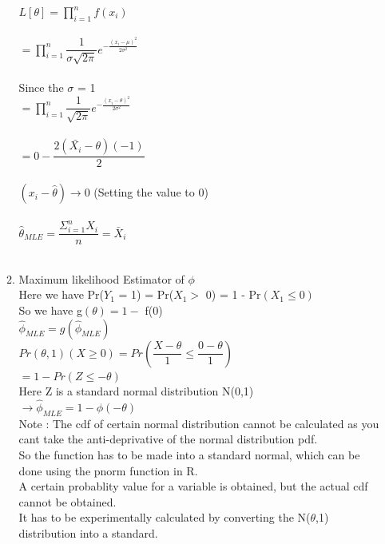 \documentclass[11pt]{article}
\begin{document}
\begin{enumerate}
\begin{enumerate}
$ L[{\theta}] = \prod_{i=1}^{n} f({x_i})     $\\\\

$ = \prod_{i=1}^{n} \dfrac{1}{\sigma \sqrt{2\pi}} e^{-\frac{({x_i}-\mu)^{2}}{2 \sigma^{2}}} $\\\\

Since the $ \sigma $ = 1 \\

$ = \prod_{i=1}^{n} \dfrac{1}{ \sqrt{2\pi}} e^{-\frac{({x_i}-\theta)^{2}}{2 \sigma^{2}}} $\\\\

$ = 0 - \dfrac{2(\bar{X_{i}}-\theta)(-1)}{2} $ \\\\

$ ({x_i}-{\hat\theta}) \rightarrow 0$ (Setting the value to 0) \\\\

$  {\hat\theta_{MLE}} = \dfrac{\Sigma_{i=1}^{n} {X_i}}{n} = \bar X_{i} $\\\\


\item Maximum likelihood Estimator of $ \phi $ \\

Here we have Pr(${Y_1}$ = 1) = Pr(${X_1} >$ 0) = 1 - Pr$({X_1} \leq 0)$\\

So we have g$(\theta) = 1 -$ f(0)\\

$ \hat\phi_{MLE} = g ({\hat\phi_{MLE}}) $ \\

$ Pr(\theta,1)(X \geq 0) = Pr(\dfrac{X - \theta}{1} \leq \dfrac{0-\theta}{1})$\\

$ = 1 - Pr(Z \leq -\theta) $\\

Here Z is a standard normal distribution N(0,1)\\

$\rightarrow \hat\phi_{MLE} = 1 - \phi(-\theta)$\\

Note : The cdf of certain normal distribution cannot be calculated as you cant take the anti-deprivative of the normal distribution pdf.\\
So the function has to be made into a standard normal, which can be done using the pnorm function in R.\\ 
A certain probablity value  for a variable is obtained, but the actual cdf cannot be obtained.\\
It has to be experimentally calculated by converting the N($\theta$,1) distribution into a standard.\\



\end{enumerate}
\end{enumerate}
\end{document}
